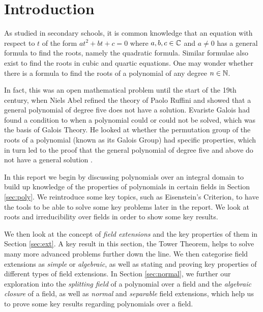 
\section{Introduction}

As studied in secondary schools, it is common knowledge that an equation with respect to $t$ of the form $at^2+bt+c = 0$ where $a, b, c \in \mathbb C$ and $a \neq 0$ has a general formula to find the roots, namely the quadratic formula. Similar formulae also exist to find the roots in cubic and quartic equations. One may wonder whether there is a formula to find the roots of a polynomial of any degree $n \in \mathbb N$.

In fact, this was an open mathematical problem until the start of the 19th century, when Niels Abel refined the theory of Paolo Ruffini and showed that a general polynomial of degree five does not have a solution. Evariste Galois had found a condition to when a polynomial could or could not be solved, which was the basis of Galois Theory. He looked at whether the permutation group of the roots of a polynomial (known as its Galois Group) had specific properties, which in turn led to the proof that the general polynomial of degree five and above do not have a general solution \cite[Chapter~8]{Stewart}.

In this report we begin by discussing polynomials over an integral domain to build up knowledge of the properties of polynomials in certain fields in Section \ref{sec:poly}. We reintroduce some key topics, such as Eisenstein’s Criterion, to have the tools to be able to solve some key problems later in the report. We look at roots and irreducibility over fields in order to show some key results.

We then look at the concept of \textit{field extensions} and the key properties of them in Section \ref{sec:ext}. A key result in this section, the Tower Theorem, helps to solve many more advanced problems further down the line. We then categorise field extensions as \textit{simple} or \textit{algebraic}, as well as stating and proving key properties of different types of field extensions. In Section \ref{sec:normal}, we further our exploration into the \textit{splitting field} of a polynomial over a field and the \textit{algebraic closure} of a field, as well as \textit{normal} and \textit{separable} field extensions, which help us to prove some key results regarding polynomials over a field.

